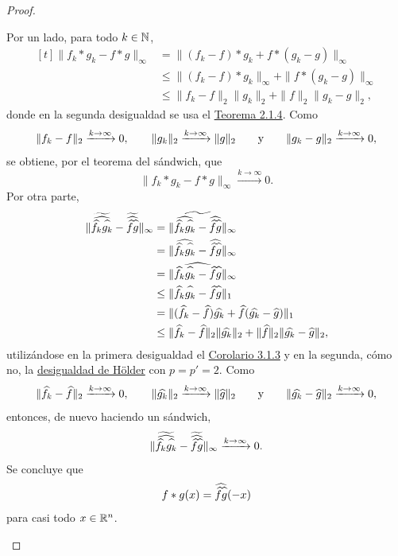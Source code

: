 \documentclass[a4paper, 11pt, oneside]{report}
\begin{document}
\begin{proof}
\begin{enumerate}
    Por un lado, para todo $k \in \mathbb N$,
    \[
    \begin{aligned}[t]
    \|f_k \ast g_k - f\ast g\|_\infty &= \|(f_k-f)\ast g_k + f \ast (g_k-g)\|_\infty \\
    &\leq \|(f_k-f)\ast g_k\|_\infty + \|f \ast (g_k-g)\|_\infty \\
    &\leq \|f_k-f\|_2\|g_k\|_2 + \|f\|_2\|g_k-g\|_2,
    \end{aligned}
    \]
    donde en la segunda desigualdad se usa el \hyperref[teo:2.1.4]{\color{c1}Teorema 2.1.4}. Como 
    \[\|f_k-f\|_2 \xrightarrow{k \to \infty} 0, \qquad \|g_k\|_2 \xrightarrow{k \to \infty} \|g\|_2 \qquad \textup{y} \qquad \|g_k-g\|_2 \xrightarrow{k \to \infty} 0,\]
    se obtiene, por el teorema del sándwich, que \[\|f_k \ast g_k - f \ast g\|_\infty \xrightarrow{k \to \infty} 0.\] 
    Por otra parte,
    \[
    \begin{aligned}[t]
    \|\widetilde{\widehat{\widehat{f_k}\widehat{\vphantom{f}g_k}}} - \widetilde{\widehat{\widehat{f}\widehat{\vphantom{f}g}}} \|_\infty &= \|\widetilde{\widehat{\widehat{f_k}\widehat{\vphantom{f}g_k}} -\widehat{\widehat{f}\widehat{\vphantom{f}g}}} \|_\infty \\
    &= \|\widehat{\widehat{f_k}\widehat{\vphantom{f}g_k}} -\widehat{\widehat{f}\widehat{\vphantom{f}g}} \|_\infty \\
    &= \|\widehat{\widehat{f_k}\widehat{\vphantom{f}g_k} - \widehat{f}\widehat{\vphantom{f}g}}\|_\infty \\
    &\leq \|\widehat{f_k}\widehat{\vphantom{f}g_k} - \widehat{f}\widehat{\vphantom{f}g}\|_1 \\
    &= \|(\widehat{f_k}-\widehat{f})\widehat{g_k} + \widehat{f}(\widehat{g_k} - \widehat{g})\|_1 \\
    &\leq \|\widehat{f_k} - \widehat{f}\|_2 \|\widehat{g_k}\|_2 + \|\widehat{f}\|_2\|\widehat{g_k} - \widehat{g}\|_2,
    \end{aligned}
    \]
    utilizándose en la primera desigualdad el \hyperref[cor:3.1.3]{\color{c1}Corolario 3.1.3} y en la segunda, cómo no, la \hyperref[cor:1.4.4]{\color{c1}desigualdad de Hölder} con $p=p'=2$. Como
    \[\|\widehat{f_k}-\widehat{f}\|_2 \xrightarrow{k \to \infty} 0, \qquad \|\widehat{g_k}\|_2 \xrightarrow{k \to \infty} \|\widehat{g}\|_2 \qquad \textup{y} \qquad \|\widehat{g_k}-\widehat{g}\|_2 \xrightarrow{k \to \infty} 0,\]
    entonces, de nuevo haciendo un sándwich,
    \[\|\widetilde{\widehat{\widehat{f_k}\widehat{\vphantom{f}g_k}}} - \widetilde{\widehat{\widehat{f}\widehat{\vphantom{f}g}}}\|_\infty \xrightarrow{k \to \infty} 0.\]
    Se concluye que
    \[f \ast g(x) = \widehat{\widehat{f}\widehat{\vphantom{f} g}}(-x)\]
    para casi todo $x \in \mathbb R^n$. \qedhere
  \end{enumerate}
\end{proof}
\end{document}
